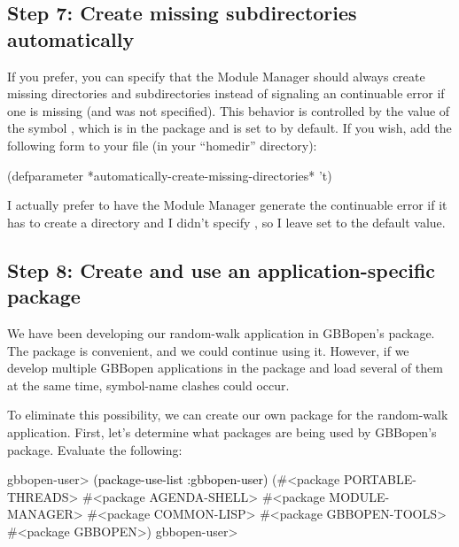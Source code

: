 \documentclass[10pt,twoside,english,pdftex]{article}
\begin{document}
\subsection*{Step 7: Create missing subdirectories automatically}

%
If you prefer, you can specify that the Module Manager should always create
missing  directories and subdirectories
instead of signaling an continuable error if one is missing (and
 was not specified).  This behavior is controlled by
the value of the symbol
, which is in the
 package and is set to \nil{} by default.  If
you wish, add the following form to your  file
(in your ``homedir'' directory):
%
\W\supp
\begin{example}
  (defparameter *automatically-create-missing-directories* 't)
\end{example}

I actually prefer to have the Module Manager generate the continuable error if
it has to create a  directory and I didn't
specify , so I leave
 set to the default
\nil{} value.

\subsection*{Step 8: Create and use an application-specific package}

We have been developing our random-walk application in GBBopen's
 package.  The  package
is convenient, and we could continue using it.  However, if we develop
multiple GBBopen applications in the  package and
load several of them at the same time, symbol-name clashes could occur.

To eliminate this possibility, we can create our own package for the
random-walk application.  First, let's determine what packages are being used
by GBBopen's  package.  Evaluate the following:
%
\W\supp
\begin{example}
\textcolor{darkergray}{%
  gbbopen-user> \textcolor{black}{(package-use-list :gbbopen-user)}
  (#<package PORTABLE-THREADS> #<package AGENDA-SHELL>
   #<package MODULE-MANAGER> #<package COMMON-LISP>
   #<package GBBOPEN-TOOLS> #<package GBBOPEN>)
  gbbopen-user>}
\end{example}
\end{document}
